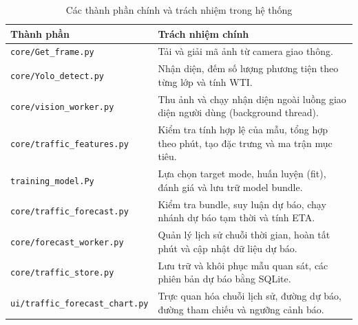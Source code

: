 \begin{table}[htbp]
        \centering
        \caption{Các thành phần chính và trách nhiệm trong hệ thống}
        \vspace{0.2cm}
        \begin{tabular}{|p{6cm}|p{10cm}|}
            \hline
            \textbf{Thành phần} & \textbf{Trách nhiệm chính} \\
            \hline
            \texttt{core/Get\_frame.py} & Tải và giải mã ảnh từ camera giao thông. \\
            \hline
            \texttt{core/Yolo\_detect.py} & Nhận diện, đếm số lượng phương tiện theo từng lớp và tính WTI. \\
            \hline
            \texttt{core/vision\_worker.py} & Thu ảnh và chạy nhận diện ngoài luồng giao diện người dùng (background thread). \\
            \hline
            \texttt{core/traffic\_features.py} & Kiểm tra tính hợp lệ của mẫu, tổng hợp theo phút, tạo đặc trưng và ma trận mục tiêu. \\
            \hline
            \texttt{training\_model.Py} & Lựa chọn target mode, huấn luyện (fit), đánh giá và lưu trữ model bundle. \\
            \hline
            \texttt{core/traffic\_forecast.py} & Kiểm tra bundle, suy luận dự báo, chạy nhánh dự báo tạm thời và tính ETA. \\
            \hline
            \texttt{core/forecast\_worker.py} & Quản lý lịch sử chuỗi thời gian, hoàn tất phút và cập nhật dữ liệu dự báo. \\
            \hline
            \texttt{core/traffic\_store.py} & Lưu trữ và khôi phục mẫu quan sát, các phiên bản dự báo bằng SQLite. \\
            \hline
            \texttt{ui/traffic\_forecast\_chart.py} & Trực quan hóa chuỗi lịch sử, đường dự báo, đường tham chiếu và ngưỡng cảnh báo. \\
            \hline
        \end{tabular}
    \end{table}